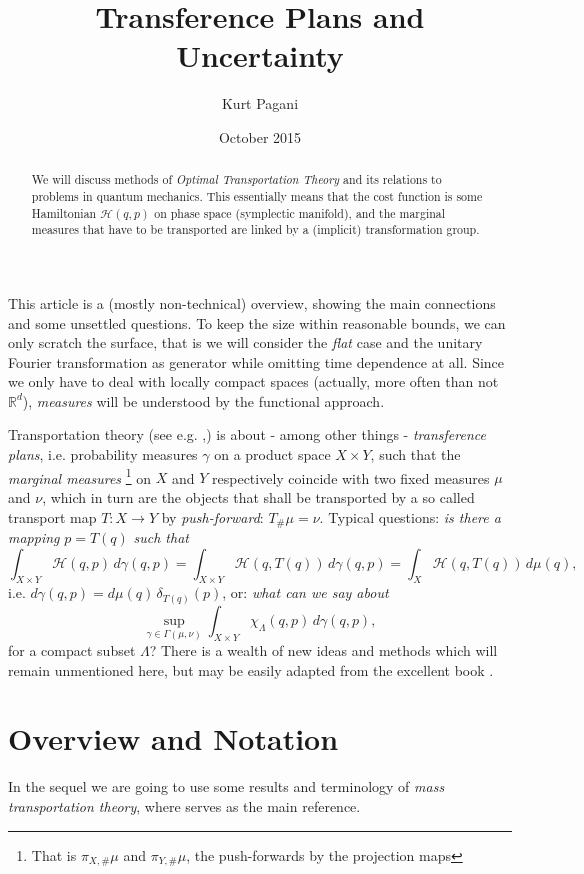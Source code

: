 \documentclass[12pt,a4paper]{article}
\author{Kurt Pagani}
\title{Transference Plans and Uncertainty}
\date{{\small October 2015}}
\newcommand{\RR}[1]{\mathbb{R}^#1}
\newcommand{\HH}{\mathcal{H}}
\begin{document}
\maketitle
\begin{abstract}
We will discuss methods of {\sl Optimal Transportation Theory} and its relations
to problems in quantum mechanics. This essentially means that the cost function
is some Hamiltonian $\HH(q,p)$ on phase space (symplectic manifold), and the marginal 
measures that have to be transported are linked by a (implicit) transformation group.   
\end{abstract}
\tableofcontents
\vspace{0.5cm}
This article is a (mostly non-technical) overview, showing the main
connections and some unsettled questions. To keep the size within reasonable bounds,
we can only scratch the surface, that is we will consider the {\sl flat} case and the 
unitary Fourier transformation as generator while omitting time dependence at all.
Since we only have to deal with locally compact spaces (actually, more often than not
${\RR d}$), {\sl measures} will be understood by the functional approach.    

Transportation theory (see e.g. \cite{Ambrosio2013},\cite{villani_topics_2003}) is about
- among other things - {\sl transference plans}, i.e. probability measures $\gamma$ on 
a product space $X\times Y$, such that the {\sl marginal measures}
\footnote{That is $\pi_{X,\#}\mu$ and $\pi_{Y,\#}\mu$, the push-forwards by the projection
maps} 
on $X$ and $Y$ respectively coincide with two fixed measures $\mu$ and $\nu$, which in 
turn are the objects that shall be transported by a so called transport map 
$T:X\longrightarrow Y$
by {\sl push-forward}: $T_\#\mu=\nu$. Typical questions: 
{\sl is there a mapping} $p=T(q)$ {\sl such that}
\begin{equation*}
     \int_{X\times Y} \HH(q,p)\,d\gamma(q,p) =  \int_{X\times Y} \HH(q,T(q))\,d\gamma(q,p)=
      \int_{X} \HH(q,T(q))\,d\mu(q),
\end{equation*} 
i.e. $d\gamma(q,p)=d\mu(q)\,\delta_{T(q)}(p)$, or: {\sl what can we say about}
\begin{equation*}
    \sup_{\gamma\in\Gamma(\mu,\nu)} \int_{X\times Y} \chi_{\Lambda}(q,p)\,d\gamma(q,p),
\end{equation*}
for a compact subset $\Lambda$? There is a wealth of new ideas and methods which will 
remain unmentioned here, but may be easily adapted from the 
excellent book \cite{villani2008optimal}.
\newpage
\section{Overview and Notation}
In the sequel we are going to use some results and terminology of
{\sl mass transportation theory}, where \cite{villani_topics_2003} serves
as the main reference.
\end{document}
